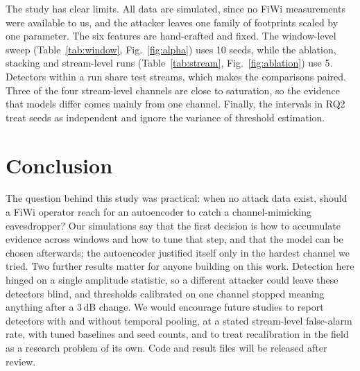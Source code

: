 \documentclass[conference]{IEEEtran}
\begin{document}
The study has clear limits. All data are simulated, since no FiWi measurements were available to us, and the attacker leaves one family of footprints scaled by one parameter. The six features are hand-crafted and fixed. The window-level sweep (Table~\ref{tab:window}, Fig.~\ref{fig:alpha}) uses 10 seeds, while the ablation, stacking and stream-level runs (Table~\ref{tab:stream}, Fig.~\ref{fig:ablation}) use 5. Detectors within a run share test streams, which makes the comparisons paired. Three of the four stream-level channels are close to saturation, so the evidence that models differ comes mainly from one channel. Finally, the intervals in RQ2 treat seeds as independent and ignore the variance of threshold estimation.

\section{Conclusion}
The question behind this study was practical: when no attack data exist, should a FiWi operator reach for an autoencoder to catch a channel-mimicking eavesdropper? Our simulations say that the first decision is how to accumulate evidence across windows and how to tune that step, and that the model can be chosen afterwards; the autoencoder justified itself only in the hardest channel we tried. Two further results matter for anyone building on this work. Detection here hinged on a single amplitude statistic, so a different attacker could leave these detectors blind, and thresholds calibrated on one channel stopped meaning anything after a 3\,dB change. We would encourage future studies to report detectors with and without temporal pooling, at a stated stream-level false-alarm rate, with tuned baselines and seed counts, and to treat recalibration in the field as a research problem of its own. Code and result files will be released after review.



\end{document}
